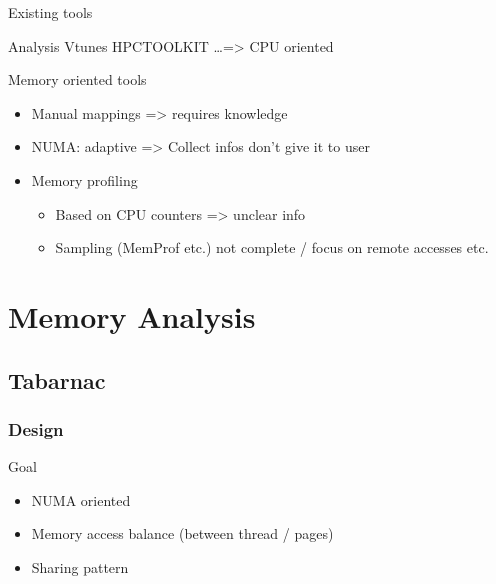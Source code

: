 \documentclass[xcolor={usenames,dvipsnames}]{beamer}
\begin{document}
\begin{frame}{Existing tools}
    \begin{block}{Analysis}
        Vtunes\cite{Reinders05VTune} HPCTOOLKIT \cite{Adhianto10HPCTOOLKIT}
        \dots => CPU oriented
    \end{block}
    \pause
    \begin{alertblock}{Memory oriented tools}
        \begin{itemize}[<+->]
            \item Manual mappings => requires knowledge
            \item NUMA: adaptive\cite{Diener13CommunicationBased,Levinthal2009} => Collect infos don't give it to user
            \item Memory profiling \cite{Lachaize12MemProf,Gimenez14Dissecting}
                \begin{itemize}
                    \item Based on CPU counters => unclear info
                    \item Sampling (MemProf etc.) not complete / focus on
                        remote accesses etc.
                \end{itemize}
        \end{itemize}
    \end{alertblock}
\end{frame}
\section{Memory Analysis}
\subsection{Tabarnac}
\subsubsection{Design}
\begin{frame}{Goal}
    \begin{itemize}
        \item NUMA oriented
        \item Memory access balance (between thread / pages)
        \item Sharing pattern
    \end{itemize}
\end{frame}
\end{document}
